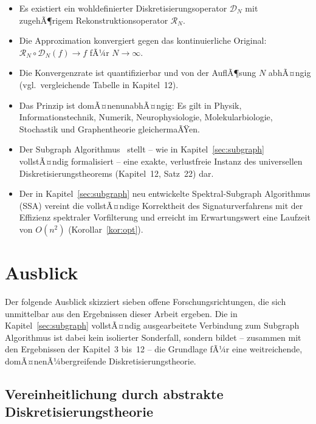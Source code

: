﻿\documentclass[a4paper,12pt]{article}
\theoremstyle{definition}
\begin{document}
\begin{itemize}
    \item Es existiert ein wohldefinierter Diskretisierungsoperator $\mathcal{D}_N$ mit zugehÃ¶rigem Rekonstruktionsoperator $\mathcal{R}_N$.
    \item Die Approximation konvergiert gegen das kontinuierliche Original: $\mathcal{R}_N \circ \mathcal{D}_N(f) \to f$ fÃ¼r $N \to \infty$.
    \item Die Konvergenzrate ist quantifizierbar und von der AuflÃ¶sung $N$ abhÃ¤ngig (vgl.\ vergleichende Tabelle in Kapitel~12).
    \item Das Prinzip ist domÃ¤nenunabhÃ¤ngig: Es gilt in Physik, Informationstechnik, Numerik, Neurophysiologie, Molekularbiologie, Stochastik und Graphentheorie gleichermaÃŸen.
    \item Der Subgraph Algorithmus~\cite{epp2026subgraph} stellt -- wie in Kapitel~\ref{sec:subgraph} vollstÃ¤ndig formalisiert -- eine exakte, verlustfreie Instanz des universellen Diskretisierungstheorems (Kapitel~12, Satz~22) dar.
    \item Der in Kapitel~\ref{sec:subgraph} neu entwickelte Spektral-Subgraph Algorithmus (SSA) vereint die vollstÃ¤ndige Korrektheit des Signaturverfahrens mit der Effizienz spektraler Vorfilterung und erreicht im Erwartungswert eine Laufzeit von $O(n^2)$ (Korollar~\ref{kor:opt}).
\end{itemize}

\section{Ausblick}
\label{sec:ausblick}

Der folgende Ausblick skizziert sieben offene Forschungsrichtungen, die sich unmittelbar aus
den Ergebnissen dieser Arbeit ergeben. Die in Kapitel~\ref{sec:subgraph} vollstÃ¤ndig
ausgearbeitete Verbindung zum Subgraph Algorithmus ist dabei kein isolierter Sonderfall,
sondern bildet -- zusammen mit den Ergebnissen der Kapitel~3 bis~12 -- die Grundlage fÃ¼r
eine weitreichende, domÃ¤nenÃ¼bergreifende Diskretisierungstheorie.

\subsection{Vereinheitlichung durch abstrakte Diskretisierungstheorie}
\end{document}
